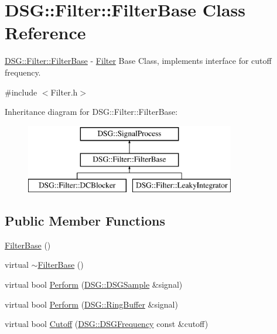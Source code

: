 \hypertarget{class_d_s_g_1_1_filter_1_1_filter_base}{\section{D\+S\+G\+:\+:Filter\+:\+:Filter\+Base Class Reference}
\label{class_d_s_g_1_1_filter_1_1_filter_base}
}


\hyperlink{class_d_s_g_1_1_filter_1_1_filter_base}{D\+S\+G\+::\+Filter\+::\+Filter\+Base} -\/ \hyperlink{namespace_d_s_g_1_1_filter}{Filter} Base Class, implements interface for cutoff frequency.  




{\ttfamily \#include $<$Filter.\+h$>$}

Inheritance diagram for D\+S\+G\+:\+:Filter\+:\+:Filter\+Base\+:\begin{figure}[H]
\begin{center}
\leavevmode
\includegraphics[height=3.000000cm]{class_d_s_g_1_1_filter_1_1_filter_base}
\end{center}
\end{figure}
\subsection*{Public Member Functions}
\begin{DoxyCompactItemize}
\item 
\hyperlink{class_d_s_g_1_1_filter_1_1_filter_base_accc0a6729e252abaa24ad7f72b2f351d}{Filter\+Base} ()
\item 
virtual \hyperlink{class_d_s_g_1_1_filter_1_1_filter_base_a1e220c7fe383eba4822f3896d8b2c2b2}{$\sim$\+Filter\+Base} ()
\item 
virtual bool \hyperlink{class_d_s_g_1_1_filter_1_1_filter_base_ae7b6f59f5408ecab3ccd6c4e723c70b4}{Perform} (\hyperlink{namespace_d_s_g_ac39a94cd27ebcd9c1e7502d0c624894a}{D\+S\+G\+::\+D\+S\+G\+Sample} \&signal)
\item 
virtual bool \hyperlink{class_d_s_g_1_1_filter_1_1_filter_base_aef58742a1362b7ef94574a16036b7109}{Perform} (\hyperlink{class_d_s_g_1_1_ring_buffer}{D\+S\+G\+::\+Ring\+Buffer} \&signal)
\item 
virtual bool \hyperlink{class_d_s_g_1_1_filter_1_1_filter_base_a1bf981bd2ca2151791d91b80dda827fe}{Cutoff} (\hyperlink{namespace_d_s_g_a4315a061386fa1014fda09b15d3a6973}{D\+S\+G\+::\+D\+S\+G\+Frequency} const \&cutoff)
\end{DoxyCompactItemize}
